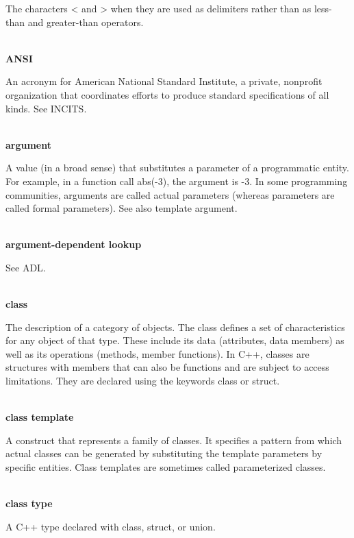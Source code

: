 The characters < and > when they are used as delimiters rather than as less-than and greater-than operators.

\hspace*{\fill} \\ %
\noindent
\textbf{ANSI}

An acronym for American National Standard Institute, a private, nonprofit organization that coordinates efforts to produce standard specifications of all kinds. See INCITS. 

\hspace*{\fill} \\ %
\noindent
\textbf{argument}

A value (in a broad sense) that substitutes a parameter of a programmatic entity. For example, in a function call abs(-3), the argument is -3. In some programming communities, arguments are called actual parameters (whereas parameters are called formal parameters). See also template argument.

\hspace*{\fill} \\ %
\noindent
\textbf{argument-dependent lookup}

See ADL.

\hspace*{\fill} \\ %
\noindent
\textbf{class}
 
The description of a category of objects. The class defines a set of characteristics for any object of that type. These include its data (attributes, data members) as well as its operations (methods, member functions). In C++, classes are structures with members that can also be functions and are subject to access limitations. They are declared using the keywords class or struct.

\hspace*{\fill} \\ %
\noindent
\textbf{class template}

A construct that represents a family of classes. It specifies a pattern from which actual classes can be generated by substituting the template parameters by specific entities. Class templates are sometimes called parameterized classes.

\hspace*{\fill} \\ %
\noindent
\textbf{class type}

A C++ type declared with class, struct, or union.

